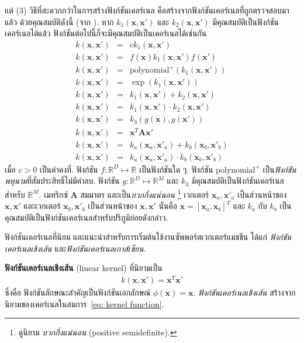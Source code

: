แต่ (3) วิธีที่สะดวกกว่าในการสร้างฟังก์ชันเคอร์เนล 
คือสร้างจากฟังก์ชันเคอร์เนลที่ถูกตรวจสอบมาแล้ว ด้วยคุณสมบัติดังนี้ (จาก \cite{Bishop2006a}).
หาก $k_1(\bm{x}, \bm{x}')$ และ $k_2(\bm{x}, \bm{x}')$ มีคุณสมบัติเป็นฟังก์ชันเคอร์เนลได้แล้ว
ฟังก์ชันต่อไปนี้ก็จะมีคุณสมบัติเป็นเคอร์เนลได้เช่นกัน 
\begin{eqnarray}
k(\bm{x}, \bm{x}') &=& c k_1(\bm{x}, \bm{x}')
\label{eq: kernel 1} \\
k(\bm{x}, \bm{x}') &=& f(\bm{x}) k_1(\bm{x}, \bm{x}') f(\bm{x}')
\label{eq: kernel 2} \\
k(\bm{x}, \bm{x}') &=& \mathrm{polynomial}^+( k_1(\bm{x}, \bm{x}') )
\label{eq: kernel 3} \\
k(\bm{x}, \bm{x}') &=& \exp( k_1(\bm{x}, \bm{x}') )
\label{eq: kernel 4} \\
k(\bm{x}, \bm{x}') &=& k_1(\bm{x}, \bm{x}') + k_2(\bm{x}, \bm{x}')
\label{eq: kernel 5} \\
k(\bm{x}, \bm{x}') &=& k_1(\bm{x}, \bm{x}') \cdot k_2(\bm{x}, \bm{x}')
\label{eq: kernel 6} \\
k(\bm{x}, \bm{x}') &=& k_3(g(\bm{x}), g(\bm{x}'))
\label{eq: kernel 7} \\
k(\bm{x}, \bm{x}') &=& \bm{x}^T \bm{A} \bm{x}'
\label{eq: kernel 8} \\
k(\bm{x}, \bm{x}') &=& k_a(\bm{x}_a, \bm{x}'_a) + k_b(\bm{x}_b, \bm{x}'_b)
\label{eq: kernel 9} \\
k(\bm{x}, \bm{x}') &=& k_a(\bm{x}_a, \bm{x}'_a) \cdot k_b(\bm{x}_b, \bm{x}'_b)
\label{eq: kernel 10}
\end{eqnarray}
เมื่อ $c > 0$ เป็นค่าคงที่.
ฟังก์ชัน $f: \mathbb{R}^D \mapsto \mathbb{R}$ เป็นฟังก์ชันใด ๆ.
ฟังก์ชัน $\mathrm{polynomial}^+$ เป็น\textit{ฟังก์ชันพหุนาม}ที่สัมประสิทธิ์ไม่มีค่าลบ.
ฟังก์ชัน  $g: \mathbb{R}^D \mapsto \mathbb{R}^M$ 
และ $k_3$ มีคุณสมบัติเป็นฟังก์ชันเคอร์เนลสำหรับ $\mathbb{R}^M$.
เมทริกซ์ $\bm{A}$ สมมาตร และเป็น\textit{บวกกึ่งแน่นอน}%
\footnote{%
ดูนิยาม \textit{บวกกึ่งแน่นอน} (positive semidefinite).
}
เวกเตอร์ $\bm{x}_a, \bm{x}'_a$ เป็นส่วนหน้าของ $\bm{x}, \bm{x}'$
และเวกเตอร์ $\bm{x}_b, \bm{x}'_b$ เป็นส่วนหน้าของ $\bm{x}, \bm{x}'$
นั่นคือ $\bm{x} = [\bm{x}_a, \bm{x}_b]^T$ 
และ $k_a$ กับ $k_b$ เป็นคุณสมบัติเป็นฟังก์ชันเคอร์เนลสำหรับปริภูมิย่อยดังกล่าว. 

ฟังก์ชันเคอร์เนลที่นิยม และแนะนำสำหรับการเริ่มต้นใช้งานซัพพอร์ตเวกเตอร์แมชชีน\cite{ChangEtAl2011a}
ได้แก่
\textit{ฟังก์ชันเคอร์เนลเชิงเส้น} 
และ\textit{ฟังก์ชันเคอร์เนลเกาส์เซียน}.

\textbf{ฟังก์ชันเคอร์เนลเชิงเส้น} (linear kernel) 
ที่นิยามเป็น 
\begin{eqnarray}
k(\bm{x}, \bm{x}') = \bm{x}^T \bm{x}'
\label{eq: svm linear kernel}
\end{eqnarray}
ซึ่งคือ ฟังก์ชันลักษณะสำคัญเป็นฟังก์ชันเอกลักษณ์ $\phi(\bm{x}) = \bm{x}$.
\textit{ฟังก์ชันเคอร์เนลเชิงเส้น} สร้างจากนิยามของเคอร์เนลในสมการ~\ref{eq: kernel function}.



